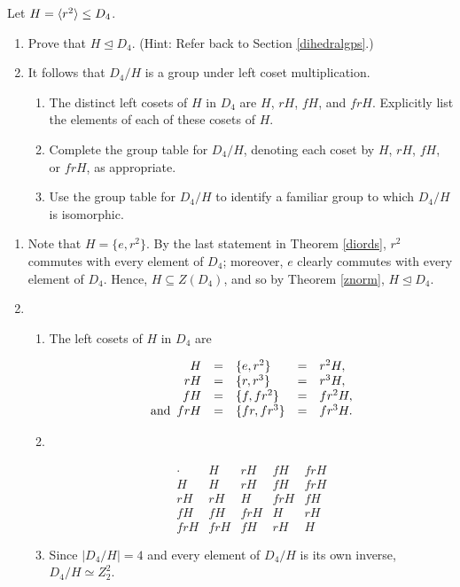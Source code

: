 \begin{exercise} Let $H=\langle r^2\rangle\leq D_4$.
\begin{enumerate}
\item Prove that $H\unlhd D_4$. (Hint: Refer back to Section \ref{dihedralgps}.)
\item It follows that $D_4/H$ is a group under left coset multiplication.
\begin{enumerate}
\item  The distinct left cosets of $H$ in $D_4$ are $H$, $rH$, $fH$, and $frH$. Explicitly list the elements of each of these cosets of $H$.
\item Complete the group table for $D_4/H$, denoting each coset by $H$, $rH$, $fH$, or $frH$, as appropriate.
\item Use the group table for $D_4/H$ to identify a familiar group to which $D_4/H$ is isomorphic.
\end{enumerate}
\end{enumerate}

\end{exercise}


\begin{solution}[print=false]

\begin{enumerate}
\item Note that $H=\{e,r^2\}$. By the last statement in Theorem \ref{diords}, $r^2$ commutes with every element of $D_4$; moreover, $e$ clearly commutes with every element of $D_4$. Hence, $H\subseteq Z(D_4)$, and so by Theorem \ref{znorm}, $H\unlhd D_4$.

\item \begin{enumerate}
\item The left cosets of $H$ in $D_4$ are


$$\begin{array}{rclcl}
H&=&\{e,r^2\}&=&r^2H,\\
rH&=&\{r,r^3\}&=&r^3H,\\
fH&=&\{f, fr^2\}&=&fr^2H,\\
\mbox{and \,}frH&=&\{fr,fr^3\}&=&fr^3H.
\end{array}$$

\item  \

\renewcommand{\arraystretch}{1.3}
$$\begin{array}{r||r|r|r|r}
\cdot &H&rH&fH&frH\\ \hline\hline H &H&rH&fH&frH\\ \hline
rH&rH&H&frH&fH\\ \hline fH&fH&frH&H&rH\\ \hline frH&frH&fH&rH&H

\end{array}$$

\item Since $|D_4/H|=4$ and every element of $D_4/H$ is its own inverse, $D_4/H\simeq Z_2^2$.
\end{enumerate}
\end{enumerate}
\end{solution}



